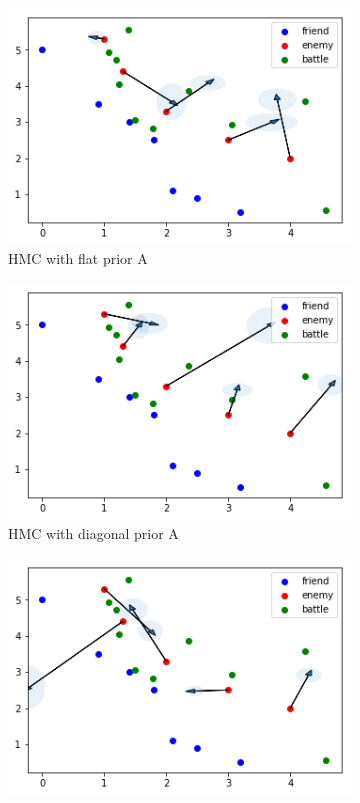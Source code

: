 \documentclass{article}
\begin{document}
\begin{figure}[h]
  \begin{subfigure}[b]{0.45\linewidth}
    \includegraphics[width=\linewidth]{Sampling11.png}
    \caption{HMC with flat prior A}
  \end{subfigure}
  \begin{subfigure}[b]{0.45\linewidth}
    \includegraphics[width=\linewidth]{Sampling12.png}
    \caption{HMC with diagonal prior A}
  \end{subfigure}
  \begin{subfigure}[b]{0.45\linewidth}
    \includegraphics[width=\linewidth]{Sampling21.png}

\end{subfigure}
\end{figure}
\end{document}
